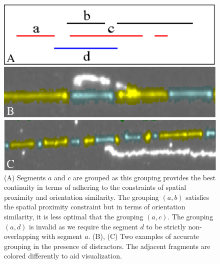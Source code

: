 \documentclass{bmcart}
\begin{document}
\begin{backmatter}
\begin{figure}[h!]
\centering
\includegraphics[width=0.8\linewidth]{grouping_figure}
\caption{
(A) Segments $a$ and $c$ are grouped as this grouping provides the best 
continuity in terms of adhering to the constraints of spatial proximity and 
orientation similarity. The grouping $(a, b)$ satisfies the spatial proximity constraint but in terms of orientation similarity, it is less optimal that the 
grouping $(a, c)$. The grouping $(a, d)$ is invalid as we require the segment 
$d$ to be strictly non-overlapping with segment $a$. (B), (C) Two examples 
of accurate grouping in the presence of distractors. The adjacent fragments are colored differently to aid 
visualization.}
\label{fig:group}
\end{figure}


\end{backmatter}
\end{document}

